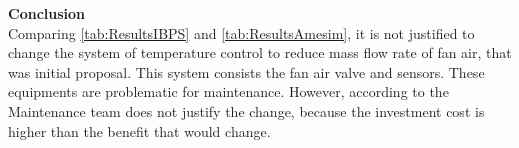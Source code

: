 \textbf{Conclusion}\\

Comparing \ref{tab:ResultsIBPS} and \ref{tab:ResultsAmesim}, it is not justified to change the system of temperature control to reduce mass flow rate of fan air, that was initial proposal.
This system consists the fan air valve and sensors. These equipments are problematic for maintenance. However, according to the Maintenance team does not justify the change, because the investment cost is higher than the benefit that would change.
